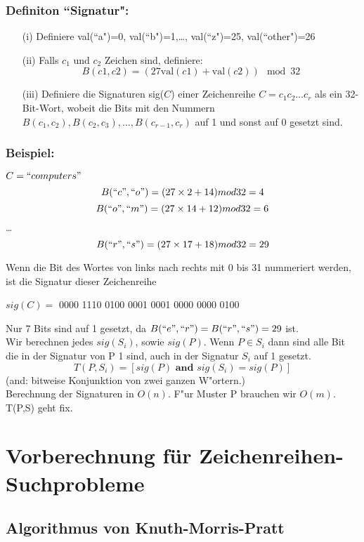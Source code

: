 \documentclass[a4paper,twoside,DIV15,BCOR12mm]{scrbook}
\begin{document}
 \subsubsection*{Definiton ``Signatur":} 
 \begin{itemize}
 	\item[(i)] Definiere val(``a")=0, val(``b")=1,\dots, val(``z")=25, val(``other")=26
 	\item[(ii)] Falls $c_1$ und $c_2$ Zeichen sind, definiere: 
 			$$B(c1,c2)=(27\text{val}(c1)+\text{val}(c2)) \mod 32$$
    \item[(iii)] Definiere die Signaturen sig($C$) einer Zeichenreihe  $C=c_1 c_2 \dots c_r$ als ein 32-Bit-Wort, wobeit die Bits mit den Nummern $B(c_1,c_2),B(c_2,c_3),\dots,B(c_{r-1},c_r)$ auf 1 und sonst auf 0 gesetzt sind.
 \end{itemize}
\subsubsection*{Beispiel:}
 $C=``computers"$\\
        $$B(``c",``o")=(27\times 2 + 14) mod 32 = 4$$
        $$B(``o",``m")=(27\times 14+ 12) mod 32 = 6$$
        \dots
        $$B(``r",``s")=(27\times 17+ 18) mod 32 = 29$$
        
        Wenn die Bit des Wortes von links nach rechts mit 0 bis 31 nummeriert werden, ist die Signatur dieser Zeichenreihe
        \begin{center} $sig(C) =$ 0000 1110 0100 0001 0001 0000 0000 0100 \end{center}
 		Nur 7 Bits sind auf 1 gesetzt, da $B(``e",``r")=B(``r",``s")=29$ ist.\\
 		Wir berechnen jedes $sig(S_i)$, sowie $sig(P)$. Wenn $P\in S_i$ dann sind alle Bit die in der Signatur von P 1 sind, auch in der Signatur $S_i$ auf 1 gesetzt.\\
 		$$T(P,S_i)=[sig(P)\textbf{ and }sig(S_i)=sig(P)]$$
 		(and:  bitweise Konjunktion von zwei ganzen W"ortern.)\\
 		Berechnung der Signaturen in $O(n)$. F"ur Muster P brauchen wir $O(m)$. T(P,S) geht fix.

\section{Vorberechnung für Zeichenreihen-Suchprobleme}

\subsection{Algorithmus von Knuth-Morris-Pratt}
\end{document}
